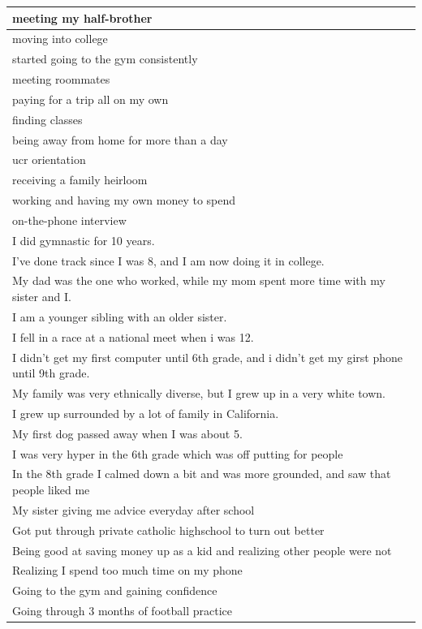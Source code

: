 \documentclass[
  .7em,
  letterpaper,
  DIV=11,
  numbers=noendperiod]{scrartcl}
\begin{document}
\begin{table}
\begin{tabular}{l}
\hline
meeting my half-brother\\
\hline
moving into college\\
\hline
started going to the gym consistently\\
\hline
meeting roommates\\
\hline
paying for a trip all on my own\\
\hline
finding classes\\
\hline
being away from home for more than a day\\
\hline
ucr orientation\\
\hline
receiving a family heirloom\\
\hline
working and having my own money to spend\\
\hline
on-the-phone interview\\
\hline
I did gymnastic for 10 years.\\
\hline
I've done track since I was 8, and I am now doing it in college.\\
\hline
My dad was the one who worked, while my mom spent more time with my sister and I.\\
\hline
I am a younger sibling with an older sister.\\
\hline
I fell in a race at a national meet when i was 12.\\
\hline
I didn't get my first computer until 6th grade, and i didn't get my girst phone until 9th grade.\\
\hline
My family was very ethnically diverse, but I grew up in a very white town.\\
\hline
I grew up surrounded by a lot of family in California.\\
\hline
My first dog passed away when I was about 5.\\
\hline
I was very hyper in the 6th grade which was off putting for people\\
\hline
In the 8th grade I calmed down a bit and was more grounded, and saw that people liked me\\
\hline
My sister giving me advice everyday after school\\
\hline
Got put through private catholic highschool to turn out better\\
\hline
Being good at saving money up as a kid and realizing other people were not\\
\hline
Realizing I spend too much time on my phone\\
\hline
Going to the gym and gaining confidence\\
\hline
Going through 3 months of football practice\\

\end{tabular}
\end{table}
\end{document}
